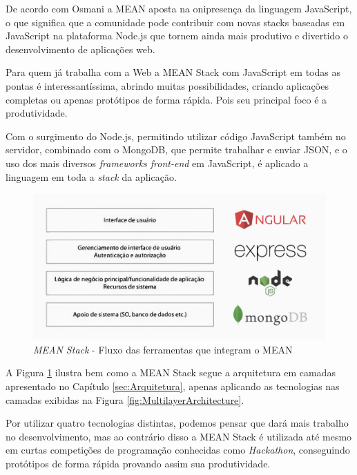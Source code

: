 \documentclass[
	12pt,				%
	openright,			%
	twoside,			%
	a4paper,			%
	english,			%
	brazil				%
	]{abntex2}
\begin{document}
De acordo com Osmani\cite{osmani_addy} a MEAN aposta na onipresença da linguagem JavaScript, o que significa que a comunidade pode contribuir com novas stacks baseadas em JavaScript na plataforma Node.js que tornem ainda mais produtivo e divertido o desenvolvimento de aplicações web.

Para quem já trabalha com a Web a MEAN Stack com JavaScript em todas as pontas é interessantíssima, abrindo muitas possibilidades, criando aplicações completas ou apenas protótipos de forma rápida. Pois seu principal foco é a produtividade.

Com o surgimento do Node.js, permitindo utilizar código JavaScript também no servidor, combinado com o MongoDB, que permite trabalhar e enviar JSON, e o uso dos mais diversos \textit{frameworks front-end} em JavaScript, é aplicado a linguagem em toda a \textit{stack} da aplicação.

\begin{figure}[h]
	\centering

	\caption{\textit{MEAN Stack} - Fluxo das ferramentas que integram o MEAN} \label{fig:MEANStackFlow}
    \includegraphics[scale=0.4]{mean-stack-flow}

\end{figure}

A Figura \ref{fig:MEANStackFlow} ilustra bem como a MEAN Stack segue a arquitetura em camadas apresentado no Capítulo \ref{sec:Arquitetura}, apenas aplicando as tecnologias nas camadas exibidas na Figura \ref{fig:MultilayerArchitecture}.

Por utilizar quatro tecnologias distintas, podemos pensar que dará mais trabalho no desenvolvimento, mas ao contrário disso a MEAN Stack é utilizada até mesmo em curtas competições de programação conhecidas como \textit{Hackathon}, conseguindo protótipos de forma rápida provando assim sua produtividade.
\end{document}
